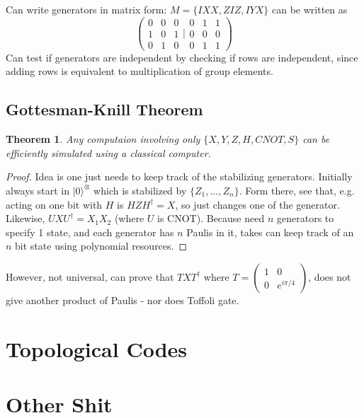 \documentclass[12pt]{article}
\newtheorem{theorem}{Theorem}[section]
\begin{document}
Can write generators in matrix form:
$M=\{IXX, ZIZ,IYX\}$ can be written as
\begin{equation}
 \left( {\begin{array}{ccc}
0 &0 & 0 \\
1 & 0 & 1 \\
0 & 1 &0 \end{array}} |
 \begin{array}{ccc}
0 &1 & 1 \\
0 & 0 & 0 \\
0 & 1 & 1 \end{array} \right)
\end{equation}
Can test if generators are independent by checking if rows are independent, since adding rows is equivalent to multiplication of group elements.

\subsection{Gottesman-Knill Theorem}
\begin{theorem}
Any computaion involving only $\{X,Y,Z,H,CNOT, S\}$ can be efficiently simulated using a classical computer.
\end{theorem}

\begin{proof}
Idea is one just needs to keep track of the stabilizing generators. Initially always start in $|0\rangle^\otimes$ which is stabilized by $\{Z_1,\dots,Z_n\}$. Form there, see that, e.g. acting on one
bit with $H$ is $HZH^\dagger=X$, so just changes one of the generator. Likewise, $UXU^\dagger=X_1X_2$ (where $U$ is CNOT). Because need $n$ generators to specify 1 state, and each generator has $n$ Paulis in it, takes can keep track of an $n$ bit state using polynomial resources.
\end{proof}

However, not universal, can prove that $TXT^\dagger$ where $T=\left ( \begin{array}{cc} 1 & 0 \\ 0 & e^{i\pi/4} \end{array}\right)$, does not give another product of Paulis - nor does Toffoli gate.

\section{Topological Codes}


\section{Other Shit}
\end{document}
